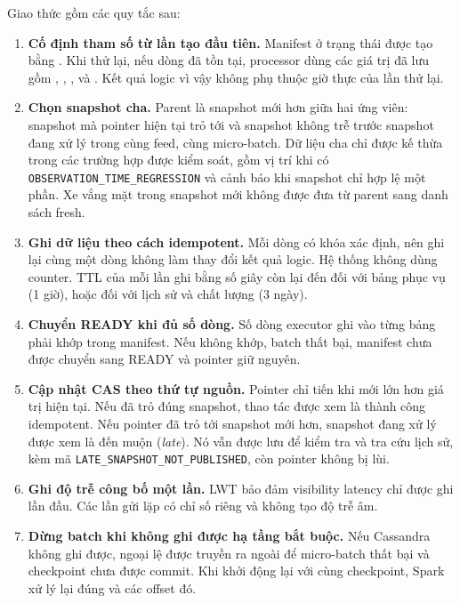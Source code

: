 Giao thức gồm các quy tắc sau:
\begin{enumerate}
    \item \textbf{Cố định tham số từ lần tạo đầu tiên.} Manifest ở trạng thái  được tạo bằng . Khi thử lại, nếu dòng đã tồn tại, processor dùng các giá trị đã lưu gồm , , ,  và . Kết quả logic vì vậy không phụ thuộc giờ thực của lần thử lại.
    \item \textbf{Chọn snapshot cha.} Parent là snapshot mới hơn giữa hai ứng viên: snapshot mà pointer hiện tại trỏ tới và snapshot không trễ trước snapshot đang xử lý trong cùng feed, cùng micro-batch. Dữ liệu cha chỉ được kế thừa trong các trường hợp được kiểm soát, gồm vị trí khi có \texttt{OBSERVATION\_TIME\_REGRESSION} và cảnh báo khi snapshot chỉ hợp lệ một phần. Xe vắng mặt trong snapshot mới không được đưa từ parent sang danh sách fresh.
    \item \textbf{Ghi dữ liệu theo cách idempotent.} Mỗi dòng có khóa xác định, nên ghi lại cùng một dòng không làm thay đổi kết quả logic. Hệ thống không dùng counter. TTL của mỗi lần ghi bằng số giây còn lại đến  đối với bảng phục vụ (1 giờ), hoặc  đối với lịch sử và chất lượng (3 ngày).
    \item \textbf{Chuyển READY khi đủ số dòng.} Số dòng executor ghi vào từng bảng phải khớp  trong manifest. Nếu không khớp, batch thất bại, manifest chưa được chuyển sang READY và pointer giữ nguyên.
    \item \textbf{Cập nhật CAS theo thứ tự nguồn.} Pointer chỉ tiến khi  mới lớn hơn giá trị hiện tại. Nếu đã trỏ đúng snapshot, thao tác được xem là thành công idempotent. Nếu pointer đã trỏ tới snapshot mới hơn, snapshot đang xử lý được xem là đến muộn (\textit{late}). Nó vẫn được lưu để kiểm tra và tra cứu lịch sử, kèm mã \texttt{LATE\_SNAPSHOT\_NOT\_PUBLISHED}, còn pointer không bị lùi.
    \item \textbf{Ghi độ trễ công bố một lần.} LWT  bảo đảm visibility latency chỉ được ghi lần đầu. Các lần gửi lặp có chỉ số riêng và không tạo độ trễ âm.
    \item \textbf{Dừng batch khi không ghi được hạ tầng bắt buộc.} Nếu Cassandra không ghi được, ngoại lệ được truyền ra ngoài để micro-batch thất bại và checkpoint chưa được commit. Khi khởi động lại với cùng checkpoint, Spark xử lý lại đúng  và các offset đó.
\end{enumerate}

